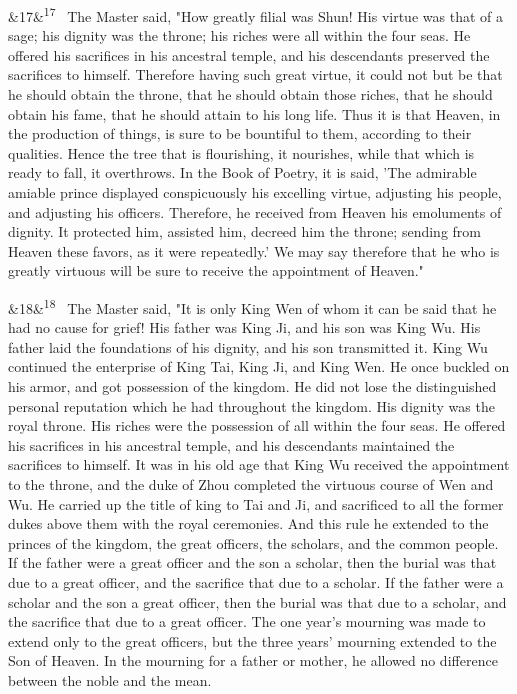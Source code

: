 \documentclass[12pt]{article}
\newcommand{\para}[1][]{\par\noindent\ifx&#1&\else\textsuperscript{\footnotesize #1}~\fi}
\begin{document}
\para[17] The Master said, "How greatly filial was Shun! His virtue was that of a sage; his dignity was the throne; his riches were all within the four seas. He offered his sacrifices in his ancestral temple, and his descendants preserved the sacrifices to himself. Therefore having such great virtue, it could not but be that he should obtain the throne, that he should obtain those riches, that he should obtain his fame, that he should attain to his long life. Thus it is that Heaven, in the production of things, is sure to be bountiful to them, according to their qualities. Hence the tree that is flourishing, it nourishes, while that which is ready to fall, it overthrows. In the Book of Poetry, it is said, 'The admirable amiable prince displayed conspicuously his excelling virtue, adjusting his people, and adjusting his officers. Therefore, he received from Heaven his emoluments of dignity. It protected him, assisted him, decreed him the throne; sending from Heaven these favors, as it were repeatedly.' We may say therefore that he who is greatly virtuous will be sure to receive the appointment of Heaven."

\para[18] The Master said, "It is only King Wen of whom it can be said that he had no cause for grief! His father was King Ji, and his son was King Wu. His father laid the foundations of his dignity, and his son transmitted it. King Wu continued the enterprise of King Tai, King Ji, and King Wen. He once buckled on his armor, and got possession of the kingdom. He did not lose the distinguished personal reputation which he had throughout the kingdom. His dignity was the royal throne. His riches were the possession of all within the four seas. He offered his sacrifices in his ancestral temple, and his descendants maintained the sacrifices to himself. It was in his old age that King Wu received the appointment to the throne, and the duke of Zhou completed the virtuous course of Wen and Wu. He carried up the title of king to Tai and Ji, and sacrificed to all the former dukes above them with the royal ceremonies. And this rule he extended to the princes of the kingdom, the great officers, the scholars, and the common people. If the father were a great officer and the son a scholar, then the burial was that due to a great officer, and the sacrifice that due to a scholar. If the father were a scholar and the son a great officer, then the burial was that due to a scholar, and the sacrifice that due to a great officer. The one year's mourning was made to extend only to the great officers, but the three years' mourning extended to the Son of Heaven. In the mourning for a father or mother, he allowed no difference between the noble and the mean.
\end{document}
